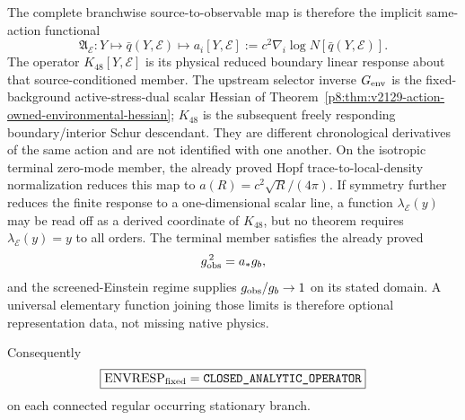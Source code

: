 \documentclass[12pt,a4paper]{article}
\begin{document}
\begin{theorem}
The complete branchwise source-to-observable map is therefore the implicit
same-action functional
\begin{equation}
\label{p8:eq:v2123-source-to-acceleration-map}
 \boxed{
 \mathfrak A_{\mathcal E}:Y
 \longmapsto \bar q(Y,\mathcal E)
 \longmapsto
 a_i[Y,\mathcal E]
 :=c^2\nabla_i\log N[\bar q(Y,\mathcal E)] .}
\end{equation}
The operator $K_{48}[Y,\mathcal E]$ is its physical reduced boundary linear
response about that source-conditioned member.  The upstream selector inverse
$G_{\rm env}$ is the fixed-background active-stress-dual scalar Hessian of
Theorem~\ref{p8:thm:v2129-action-owned-environmental-hessian}; $K_{48}$ is the
subsequent freely responding boundary/interior Schur descendant.  They are
different chronological derivatives of the same action and are not identified
with one another.  On the isotropic terminal
zero-mode member, the already proved Hopf trace-to-local-density normalization
reduces this map to $a(R)=c^2\sqrt R/(4\pi)$.  If symmetry further reduces
the finite response to a one-dimensional scalar line, a function
$\lambda_{\mathcal E}(y)$ may be read off as a derived coordinate of
$K_{48}$, but no theorem requires $\lambda_{\mathcal E}(y)=y$ to all orders.
The terminal member satisfies the already proved
\[
 g_{\rm obs}^{\,2}=a_*g_b,
\]
and the screened-Einstein regime supplies $g_{\rm obs}/g_b\to1$ on its stated
domain.  A universal elementary function joining those limits is therefore
optional representation data, not missing native physics.

Consequently
\begin{equation}
\label{p8:eq:v2123-envresp-status}
 \boxed{
 \mathrm{ENVRESP}_{\rm fixed}
 =\texttt{CLOSED\_ANALYTIC\_OPERATOR}}
\end{equation}
on each connected regular occurring stationary branch.
\end{theorem}
\end{document}
